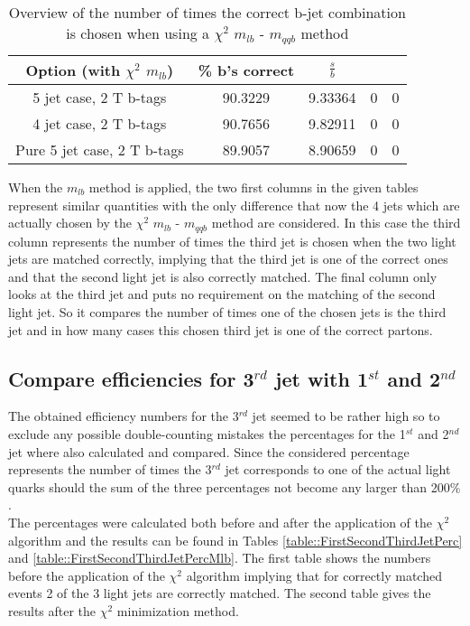  \begin{table}[!h] 
 \begin{tabular}{c|c|c|c|c} 
 \textbf{Option} (with $\chi^{2}$ $m_{lb}$) & \% b's correct   & $\frac{s}{b}$ &  &  \\ \hline 
 5 jet case,      2 T b-tags              & 90.3229 & 9.33364 & 0 & 0 \\ 
 4 jet case,      2 T b-tags              & 90.7656 & 9.82911 & 0 & 0 \\ 
 Pure 5 jet case, 2 T b-tags              & 89.9057 & 8.90659 & 0 & 0 \\ 
 \end{tabular} 
 \caption{Overview of the number of times the correct b-jet combination is chosen when using a $\chi^{2}$ $m_{lb}$ - $m_{qqb}$ method} 
 \end{table} 
When the $m_{lb}$ method is applied, the two first columns in the given tables represent similar quantities with the only difference that now the 4 jets which are actually chosen by the $\chi^{2}$ $m_{lb}$ - $m_{qqb}$ method are considered. 
In this case the third column represents the number of times the third jet is chosen when the two light jets are matched correctly, implying that the third jet is one of the correct ones and that the second light jet is also correctly matched. The final column only looks at the third jet and puts no requirement on the matching of the second light jet. So it compares the number of times one of the chosen jets is the third jet and in how many cases this chosen third jet is one of the correct partons.

\subsection{Compare efficiencies for 3$^{rd}$ jet with 1$^{st}$ and 2$^{nd}$}
The obtained efficiency numbers for the 3$^{rd}$ jet seemed to be rather high so to exclude any possible double-counting mistakes the percentages for the 1$^{st}$ and 2$^{nd}$ jet where also calculated and compared. Since the considered percentage represents the number of times the 3$^{rd}$ jet corresponds to one of the actual light quarks should the sum of the three percentages not become any larger than 200$\%$.\\
The percentages were calculated both before and after the application of the $\chi^{2}$ algorithm and the results can be found in Tables \ref{table::FirstSecondThirdJetPerc} and \ref{table::FirstSecondThirdJetPercMlb}. The first table shows the numbers before the application of the $\chi^{2}$ algorithm implying that for correctly matched events 2 of the 3 light jets are correctly matched. The second table gives the results after the $\chi^2$ minimization method.

